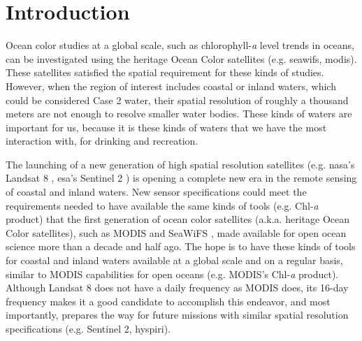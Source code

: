 \chapter{Introduction}
\label{ch:introduction} 


Ocean color studies at a global scale, such as chlorophyll-{\it a} level trends in oceans, can be investigated using the heritage Ocean Color satellites (e.g. \acrfull{seawifs}, \acrfull{modis}). These satellites satisfied the spatial requirement for these kinds of studies. However, when the region of interest includes coastal or inland waters, which could be considered Case 2 water, their spatial resolution of roughly a thousand meters are not enough to resolve smaller water bodies. These kinds of waters are important for us, because it is these kinds of waters that we have the most interaction with, for drinking and recreation. 

The launching of a new generation of high spatial resolution satellites (e.g. \acrshort{nasa}'s Landsat 8 \cite{Irons:2012}, \acrshort{esa}'s Sentinel 2 \cite{Malenovsky:2012}) is opening a complete new era in the remote sensing of coastal and inland waters. New sensor specifications could meet the requirements needed to have available the same kinds of tools (e.g. Chl-{\it a} product) that the first generation of ocean color satellites (a.k.a. heritage Ocean Color satellites), such as MODIS \cite{Esaias1998} and SeaWiFS \cite{McClain2004}, made available for open ocean science more than a decade and half ago. The hope is to have these kinds of tools for coastal and inland waters available at a global scale and on a regular basis, similar to MODIS capabilities for open oceans (e.g. MODIS's Chl-{\it a} product). Although Landsat 8 does not have a daily frequency as MODIS does, its 16-day frequency makes it a good candidate to accomplish this endeavor, and most importantly, prepares the way for future missions with similar spatial resolution specifications (e.g. Sentinel 2, \acrfull{hyspiri}).

